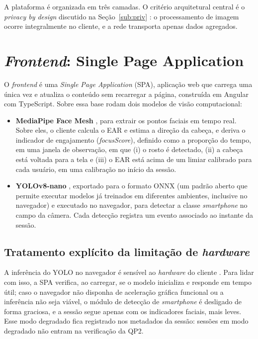 \documentclass[portuguese,oneside]{tcc}
\begin{document}
A plataforma é organizada em três camadas. O critério arquitetural central é o \emph{privacy by design} discutido na Seção~\ref{sub:priv} \cite{HBF19,UNE21}: o processamento de imagem ocorre integralmente no cliente, e a rede transporta apenas dados agregados.

\section{\emph{Frontend}: Single Page Application}

O \emph{frontend} é uma \emph{Single Page Application} (SPA), aplicação web que carrega uma única vez e atualiza o conteúdo sem recarregar a página, construída em Angular com TypeScript. Sobre essa base rodam dois modelos de visão computacional:

\begin{itemize}
  \item \textbf{MediaPipe Face Mesh} \cite{LTN19,KAGG19}, para extrair os pontos faciais em tempo real. Sobre eles, o cliente calcula o EAR \cite{SC16} e estima a direção da cabeça, e deriva o indicador de engajamento (\emph{focusScore}), definido como a proporção do tempo, em uma janela de observação, em que (i) o rosto é detectado, (ii) a cabeça está voltada para a tela e (iii) o EAR está acima de um limiar calibrado para cada usuário, em uma calibração no início da sessão.
  \item \textbf{YOLOv8-nano} \cite{RDGF16,JCQ23}, exportado para o formato ONNX (um padrão aberto que permite executar modelos já treinados em diferentes ambientes, inclusive no navegador) e executado no navegador, para detectar a classe \emph{smartphone} no campo da câmera. Cada detecção registra um evento associado ao instante da sessão.
\end{itemize}

\subsection{\label{sub:hw}Tratamento explícito da limitação de \emph{hardware}}

A inferência do YOLO no navegador é sensível ao \emph{hardware} do cliente \cite{JCQ23}. Para lidar com isso, a SPA verifica, ao carregar, se o modelo inicializa e responde em tempo útil; caso o navegador não disponha de aceleração gráfica funcional ou a inferência não seja viável, o módulo de detecção de \emph{smartphone} é desligado de forma graciosa, e a sessão segue apenas com os indicadores faciais, mais leves. Esse modo degradado fica registrado nos metadados da sessão: sessões em modo degradado não entram na verificação da QP2.
\end{document}
